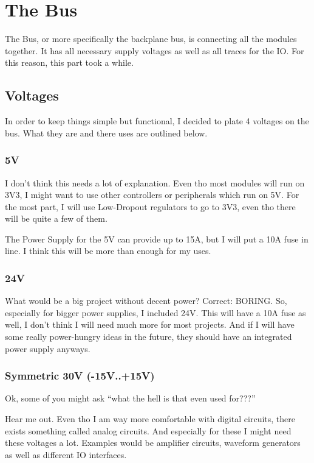 \chapter{The Bus}
The Bus, or more specifically the backplane bus, is connecting all the modules together. It has all necessary supply voltages as well as all traces for the IO. For this reason, this part took a while.

\section{Voltages}
In order to keep things simple but functional, I decided to plate 4 voltages on the bus. What they are and there uses are outlined below.

\subsection{5V}
I don't think this needs a lot of explanation. Even tho most modules will run on 3V3, I might want to use other controllers or peripherals which run on 5V. For the most part, I will use Low-Dropout regulators to go to 3V3, even tho there will be quite a few of them. 

The Power Supply for the 5V can provide up to 15A, but I will put a 10A fuse in line. I think this will be more than enough for my uses.

\subsection{24V}
What would be a big project without decent power? Correct: BORING. So, especially for bigger power supplies, I included 24V. This will have a 10A fuse as well, I don't think I will need much more for most projects. And if I will have some really power-hungry ideas in the future, they should have an integrated power supply anyways. 

\subsection{Symmetric 30V (-15V..+15V)}
Ok, some of you might ask ``what the hell is that even used for???''

Hear me out. Even tho I am way more comfortable with digital circuits, there exists something called analog circuits. And especially for these I might need these voltages a lot. Examples would be amplifier circuits, waveform generators as well as different IO interfaces. 

